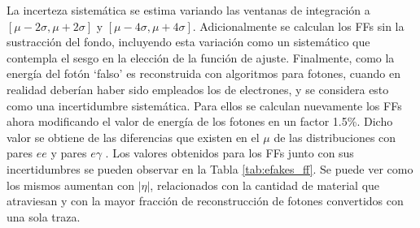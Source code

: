 La incerteza sistemática se estima variando las ventanas de integración a $[\mu - 2\sigma, \mu + 2\sigma]$ y $[\mu - 4\sigma, \mu + 4\sigma]$. Adicionalmente se calculan los FFs sin la sustracción del fondo, incluyendo esta variación como un sistemático que contempla el sesgo en la elección de la función de ajuste. Finalmente, como la energía del fotón `falso' es reconstruida con algoritmos para fotones, cuando en realidad deberían haber sido empleados los de electrones, y se considera esto como una incertidumbre sistemática. Para ellos se calculan nuevamente los FFs ahora modificando el valor de energía de los fotones en un factor 1.5\%. Dicho valor se obtiene de las diferencias que existen en el $\mu$ de las distribuciones con pares $ee$ y pares $e\gamma$ \cite{EXOT-2016-32}. Los valores obtenidos para los FFs junto con sus incertidumbres se pueden observar en la Tabla \ref{tab:efakes_ff}. Se puede ver como los mismos aumentan con $|\eta|$, relacionados con la cantidad de material que atraviesan y con la mayor fracción de reconstrucción de fotones convertidos con una sola traza.


\begin{table}
\centering
\caption{Factores de reconstrucción errónea de electrones como fotones en función de $|\eta|$ para todos los datos del Run 2. Se muestran explícitas las incertidumbres estadísticas y sistemáticas provenientes de variar la ventana de integración, no emplear la sustracción de fondo y el sesgo en la energía de los fotones.}
\label{tab:efakes_ff}
\end{table}


